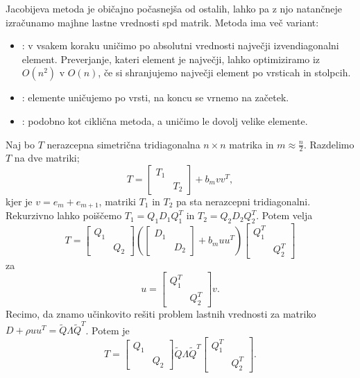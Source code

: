 
Jacobijeva metoda je običajno počasnejša od ostalih, lahko pa z njo natančneje
izračunamo majhne lastne vrednosti spd matrik.
Metoda ima več variant:
\begin{itemize}
\item {}: v vsakem koraku uničimo po absolutni vrednosti
  največji izvendiagonalni element.
  Preverjanje, kateri element je največji, lahko optimiziramo iz $O(n^2)$ v
  $O(n)$, če si shranjujemo največji element po vrsticah in stolpcih.
\item {}: elemente uničujemo po vrsti, na koncu se vrnemo
  na začetek.
\item {}: podobno kot ciklična metoda, a uničimo le
  dovolj velike elemente.
\end{itemize}



Naj bo $T$ nerazcepna simetrična tridiagonalna $n \times n$ matrika in $m
\approx \frac{n}{2}$.
Razdelimo $T$ na dve matriki;
\[
  T =
  \begin{bmatrix}
	T_1 & \\
	& T_2
  \end{bmatrix}
  + b_m v v^T,
\]
kjer je $v = e_m + e_{m+1}$, matriki $T_1$ in $T_2$ pa sta nerazcepni
tridiagonalni.
Rekurzivno lahko poiščemo $T_1 = Q_1 D_1 Q_1^T$ in $T_2 = Q_2 D_2 Q_2^T$.
Potem velja
\[
  T =
  \begin{bmatrix}
	Q_1 & \\
	& Q_2
  \end{bmatrix}
  \left(
	\begin{bmatrix}
	  D_1 & \\
		  & D_2
	\end{bmatrix}
	+ b_m u u^T
  \right)
  \begin{bmatrix}
	Q_1^T & \\
	& Q_2^T
  \end{bmatrix}
\]
za
\[
  u =
  \begin{bmatrix}
	Q_1^T & \\
		  & Q_2^T
  \end{bmatrix}
  v.
\]
Recimo, da znamo učinkovito rešiti problem lastnih vrednosti za matriko $D +
\rho u u^T = \tilde{Q} \Lambda \tilde{Q}^T$.
Potem je
\[
  T =
  \begin{bmatrix}
	Q_1 & \\
	& Q_2
  \end{bmatrix}
  \tilde{Q}
  \Lambda
  \tilde{Q}^T
  \begin{bmatrix}
	Q_1^T & \\
	& Q_2^T
  \end{bmatrix}.
\]

